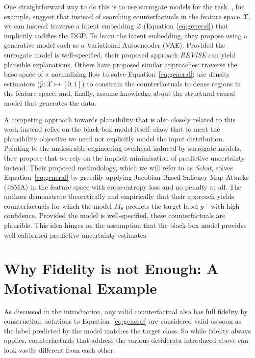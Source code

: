 \documentclass[letterpaper]{article} %
\begin{document}
One straightforward way to do this is to use surrogate models for the task. \citet{joshi2019realistic}, for example, suggest that instead of searching counterfactuals in the feature space $\mathcal{X}$, we can instead traverse a latent embedding $\mathcal{Z}$ (Equation~\ref{eq:general}) that implicitly codifies the DGP. To learn the latent embedding, they propose using a generative model such as a Variational Autoencoder (VAE). Provided the surrogate model is well-specified, their proposed approach \textit{REVISE} can yield plausible explanations. Others have proposed similar approaches: \citet{dombrowski2021diffeomorphic} traverse the base space of a normalizing flow to solve Equation~\ref{eq:general}; \citet{poyiadzi2020face} use density estimators ($\hat{p}: \mathcal{X} \mapsto [0,1]$) to constrain the counterfactuals to dense regions in the feature space; and, finally, \citet{karimi2021algorithmic} assume knowledge about the structural causal model that generates the data.

A competing approach towards plausibility that is also closely related to this work instead relies on the black-box model itself. \citet{schut2021generating} show that to meet the plausibility objective we need not explicitly model the input distribution. Pointing to the undesirable engineering overhead induced by surrogate models, they propose that we rely on the implicit minimisation of predictive uncertainty instead. Their proposed methodology, which we will refer to as \textit{Schut}, solves Equation~\ref{eq:general} by greedily applying Jacobian-Based Saliency Map Attacks (JSMA) in the feature space with cross-entropy loss and no penalty at all. The authors demonstrate theoretically and empirically that their approach yields counterfactuals for which the model $M_{\theta}$ predicts the target label $\mathbf{y}^+$ with high confidence. Provided the model is well-specified, these counterfactuals are plausible. This idea hinges on the assumption that the black-box model provides well-calibrated predictive uncertainty estimates.

\section{Why Fidelity is not Enough: A Motivational Example}\label{fidelity}

As discussed in the introduction, any valid counterfactual also has full fidelity by construction: solutions to Equation~\ref{eq:general} are considered valid as soon as the label predicted by the model matches the target class. So while fidelity always applies, counterfactuals that address the various desiderata introduced above can look vastly different from each other. 
\end{document}
